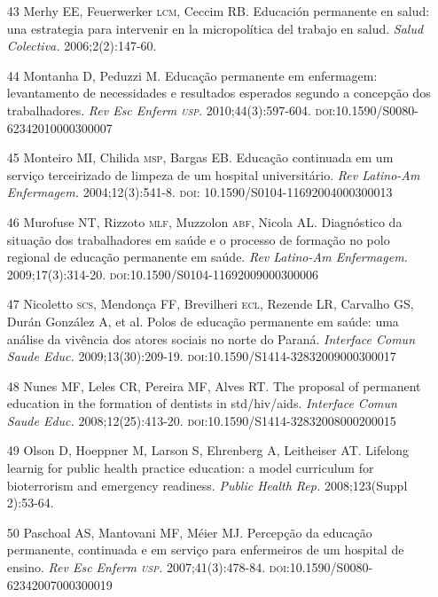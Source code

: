\documentclass{article}
\begin{document}
\begin{itemize}
\item[43] Merhy EE, Feuerwerker \textsc{lcm}, Ceccim RB. Educación permanente en salud:
una estrategia para intervenir en la micropolítica del trabajo en salud.
\textit{Salud Colectiva.}
2006;2(2):147-60.

\item[44] Montanha D, Peduzzi M. Educação permanente em enfermagem: levantamento
de necessidades e resultados esperados segundo a concepção dos trabalhadores.
\textit{Rev Esc Enferm \textsc{usp}}. 2010;44(3):597-604. \textsc{doi}:10.1590/S0080-62342010000300007

\item[45] Monteiro MI, Chilida \textsc{msp}, Bargas EB. Educação continuada em um serviço
terceirizado de limpeza de um hospital universitário. \textit{Rev Latino-Am
Enfermagem.}
2004;12(3):541-8. \textsc{doi}: 10.1590/S0104-11692004000300013

\item[46] Murofuse NT, Rizzoto \textsc{mlf}, Muzzolon \textsc{abf}, Nicola AL. Diagnóstico da
situação dos trabalhadores em saúde e o processo de formação no polo regional de
educação permanente em saúde. \textit{Rev Latino-Am Enfermagem.}
2009;17(3):314-20. \textsc{doi}:10.1590/S0104-11692009000300006

\item[47] Nicoletto \textsc{scs}, Mendonça FF, Brevilheri \textsc{ecl}, Rezende LR, Carvalho GS,
Durán González A, et al. Polos de educação permanente em saúde: uma análise da
vivência dos atores sociais no norte do Paraná. \textit{Interface Comun Saude
Educ.}
2009;13(30):209-19. \textsc{doi}:10.1590/S1414-32832009000300017

\item[48] Nunes MF, Leles CR, Pereira MF, Alves RT. The proposal of permanent
education in the formation of dentists in std/hiv/aids. \textit{Interface Comun
Saude Educ.}
2008;12(25):413-20. \textsc{doi}:10.1590/S1414-32832008000200015

\item[49] Olson D, Hoeppner M, Larson S, Ehrenberg A, Leitheiser AT. Lifelong
learnig for public health practice education: a model curriculum for
bioterrorism and emergency readiness. \textit{Public Health Rep.}
2008;123(Suppl 2):53-64.

\item[50] Paschoal AS, Mantovani MF, Méier MJ. Percepção da educação permanente,
continuada e em serviço para enfermeiros de um hospital de ensino. \textit{Rev
Esc Enferm \textsc{usp}.}
2007;41(3):478-84. \textsc{doi}:10.1590/S0080-62342007000300019


\end{itemize}
\end{document}
